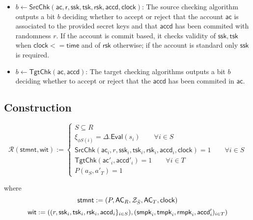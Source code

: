 \documentclass{article}      	%
\begin{document}
\begin{itemize}
\item $b \gets \mathsf{SrcChk}(\mathsf{ac,r,ssk,tsk,rsk,accd,clock})$: The source checking algorithm outputs a bit $b$ deciding whether to accept or reject that the account $\mathsf{ac}$ is associated to the provided secret keys and that $\mathsf{accd}$ has been commited with randomness $r$. If the account is commit based, it checks validity of $\mathsf{ssk,tsk}$ when $\mathsf{clock} <= \mathsf{time}$ and of $\mathsf{rsk}$ otherwise; if the account is standard only $\mathsf{ssk}$ is required.
\item $b \gets \mathsf{TgtChk}(\mathsf{ac,accd})$: The target checking algorithms outputs a bit $b$ deciding whether to accept or reject that the $\mathsf{accd}$ has been commited in $\mathsf{ac}$. 
\end{itemize}


\subsection*{Construction}

\begin{equation*}
\mathcal{R}(\mathsf{stmnt}, \mathsf{wit}) := \begin{cases} 
    S \subseteq R \\ 
    \xi_{\phi S(i)} = \Delta.\mathsf{Eval}(s_i) \qquad \forall i \in S \\
    \mathsf{SrcChk}(\mathsf{ac}_i, r, \mathsf{ssk}_i, \mathsf{tsk}_i, \mathsf{rsk}_i, \mathsf{accd}_i, \mathsf{clock}) = 1 \qquad \forall i \in S \\ 
    \mathsf{TgtChk}(\mathsf{ac'}_i, \mathsf{accd}'_i) = 1 \qquad \forall i \in T \\ 
    P(a_S, a'_T) = 1
\end{cases}
\end{equation*}

where 
\begin{equation*}
\mathsf{stmnt} := (P,\mathsf{AC}_R,\mathcal{Z}_{\bar{S}}, \mathsf{AC}_T, \mathsf{clock}) \\
\end{equation*}
\begin{equation*}
\mathsf{wit} := ((r,\mathsf{ssk}_i, \mathsf{tsk}_i, \mathsf{rsk}_i, \mathsf{accd}_i\}_{i\in S}), (\mathsf{smpk}_i, \mathsf{tmpk}_i, \mathsf{rmpk}_i, \mathsf{accd}'_i)_{i\in T}) \\
\end{equation*}
\end{document}
